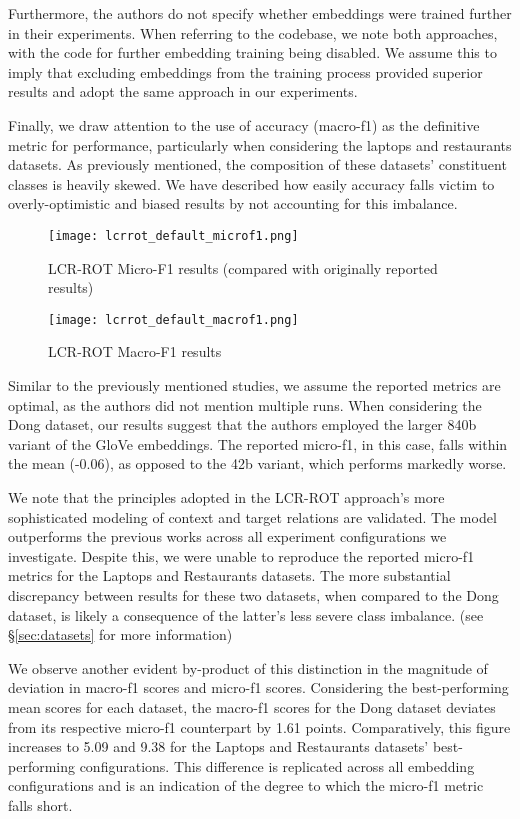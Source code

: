 \documentclass[../../fyp.tex]{subfiles}
\begin{document}
Furthermore, the authors do not specify whether embeddings were trained further in their experiments. When referring to the codebase, we note both approaches, with the code for further embedding training being disabled. We assume this to imply that excluding embeddings from the training process provided superior results and adopt the same approach in our experiments. 

Finally, we draw attention to the use of accuracy (macro-f1) as the definitive metric for performance, particularly when considering the laptops and restaurants datasets. As previously mentioned, the composition of these datasets' constituent classes is heavily skewed. We have described how easily accuracy falls victim to overly-optimistic and biased results by not accounting for this imbalance.   

\begin{figure}[!ht]
	\centering
	\texttt{[image: lcrrot\_default\_microf1.png]}
	\caption{LCR-ROT Micro-F1 results (compared with originally reported results)}
	\label{fig:lcrrot_default_microf1}
\end{figure}

\begin{figure}[!ht]
	\centering
	\texttt{[image: lcrrot\_default\_macrof1.png]}
	\caption{LCR-ROT Macro-F1 results}
	\label{fig:lcrrot_default_macrof1}
\end{figure}

Similar to the previously mentioned studies, we assume the reported metrics are optimal, as the authors did not mention multiple runs. When considering the Dong dataset, our results suggest that the authors employed the larger 840b variant of the GloVe embeddings. The reported micro-f1, in this case, falls within the mean (-0.06), as opposed to the 42b variant, which performs markedly worse. 

We note that the principles adopted in the LCR-ROT approach's more sophisticated modeling of context and target relations are validated. The model outperforms the previous works across all experiment configurations we investigate. Despite this, we were unable to reproduce the reported micro-f1 metrics for the Laptops and Restaurants datasets. The more substantial discrepancy between results for these two datasets, when compared to the Dong dataset, is likely a consequence of the latter's less severe class imbalance. (see \S\ref{sec:datasets} for more information) 

We observe another evident by-product of this distinction in the magnitude of deviation in macro-f1 scores and micro-f1 scores. Considering the best-performing mean scores for each dataset, the macro-f1 scores for the Dong dataset deviates from its respective micro-f1 counterpart by 1.61 points. Comparatively, this figure increases to 5.09 and 9.38 for the Laptops and Restaurants datasets' best-performing configurations. This difference is replicated across all embedding configurations and is an indication of the degree to which the micro-f1 metric falls short.
\end{document}
